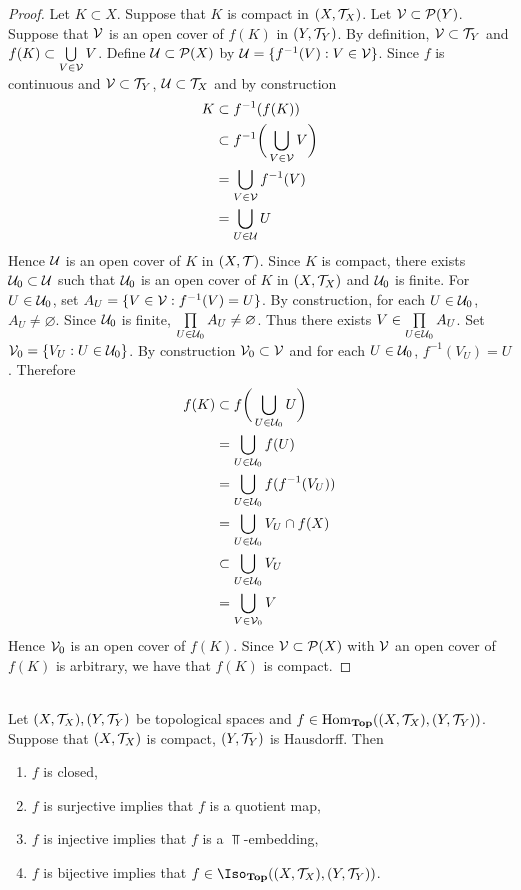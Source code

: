 \documentclass{book}
\begin{document}
\begin{proof}
	Let $K \subset X$. Suppose that $K$ is compact in $(X, \mathcal{T}_X)$. Let $\mathcal{V} \subset \mathcal{P}(Y)$. Suppose that $\mathcal{V}$ is an open cover of $f(K)$ in $(Y, \mathcal{T}_Y)$. By definition, $\mathcal{V} \subset \mathcal{T}_Y$ and $f(K) \subset \bigcup\limits_{V \in \mathcal{V}} V$. Define $\mathcal{U} \subset \mathcal{P}(X)$ by $\mathcal{U} = \{f^{-1}(V):V \in \mathcal{V}\}$. Since $f$ is continuous and $\mathcal{V} \subset \mathcal{T}_Y$, $\mathcal{U} \subset \mathcal{T}_X$ and by construction
	\begin{align*}
		K
		& \subset f^{-1}(f(K)) \\
		& \subset f^{-1}\bigg( \bigcup\limits_{V \in \mathcal{V}} V \bigg) \\
		& = \bigcup\limits_{V \in \mathcal{V}} f^{-1}(V) \\
		& = \bigcup\limits_{U \in \mathcal{U}} U \\
	\end{align*}
	Hence $\mathcal{U}$ is an open cover of $K$ in $(X, \mathcal{T})$. Since $K$ is compact, there exists $\mathcal{U}_0 \subset \mathcal{U}$ such that $\mathcal{U}_0$ is an open cover of $K$ in $(X, \mathcal{T}_X)$ and $\mathcal{U}_0$ is finite. For $U \in \mathcal{U}_0$, set $A_U = \{V \in \mathcal{V}: f^{-1}(V) = U \}$. By construction, for each $U \in \mathcal{U}_0$, $A_U \neq \varnothing$. Since $\mathcal{U}_0$ is finite, $\prod\limits_{U \in \mathcal{U}_0} A_U \neq \varnothing$. Thus there exists $V \in \prod\limits_{U \in \mathcal{U}_0} A_U$. Set $\mathcal{V}_0 = \{V_U: U \in \mathcal{U}_0\}$. By construction $\mathcal{V}_0 \subset \mathcal{V}$ and for each $U \in \mathcal{U}_0$, $f^{-1}(V_U) = U$. Therefore 
	\begin{align*}
		f(K)
		& \subset f \bigg( \bigcup\limits_{U \in \mathcal{U}_0} U \bigg) \\
		& = \bigcup\limits_{U \in \mathcal{U}_0} f(U) \\
		& = \bigcup\limits_{U \in \mathcal{U}_0} f (f^{-1}(V_U)) \\
		& = \bigcup\limits_{U \in \mathcal{U}_0} V_U \cap f(X) \\
		& \subset \bigcup\limits_{U \in \mathcal{U}_0} V_U \\
		& = \bigcup\limits_{V \in \mathcal{V}_0} V \\
	\end{align*}
	Hence $\mathcal{V}_0$ is an open cover of $f(K)$. Since $\mathcal{V} \subset \mathcal{P}(X)$ with $\mathcal{V}$ an open cover of $f(K)$ is arbitrary, we have that $f(K)$ is compact.
\end{proof}


\begin{ex}    \\
	Let $(X, \mathcal{T}_X), (Y, \mathcal{T}_Y)$ be topological spaces and $f \in \operatorname{Hom}_{\operatorname*{\text{\textbf{Top}}}}((X, \mathcal{T}_X), (Y, \mathcal{T}_Y))$. Suppose that $(X, \mathcal{T}_X)$ is compact, $(Y, \mathcal{T}_Y)$ is Hausdorff. Then 
	\begin{enumerate}
		\item $f$ is closed,
		\item $f$ is surjective implies that $f$ is a quotient map,
		\item $f$ is injective implies that $f$ is a $\Top$-embedding,
		\item $f$ is bijective implies that $f \in \Iso_{\Top}((X, \MT_X), (Y, \MT_Y))$.
	\end{enumerate}
\end{ex}
\end{document}
